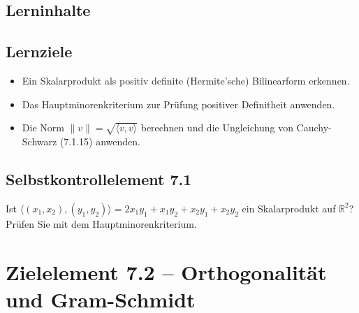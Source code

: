 \documentclass[a4paper,12pt]{article}
\begin{document}
\subsection*{Lerninhalte}
\begin{center}
\end{center}

\subsection*{Lernziele}
\begin{itemize}
  \item Ein Skalarprodukt als positiv definite (Hermite'sche) Bilinearform erkennen.
  \item Das Hauptminorenkriterium zur Prüfung positiver Definitheit anwenden.
  \item Die Norm $\|v\| = \sqrt{\langle v,v\rangle}$ berechnen und die Ungleichung von Cauchy-Schwarz (7.1.15) anwenden.
\end{itemize}

\subsection*{Selbstkontrollelement 7.1}
Ist $\langle (x_1,x_2),(y_1,y_2)\rangle = 2x_1y_1 + x_1y_2 + x_2y_1 + x_2y_2$ ein Skalarprodukt auf $\mathbb{R}^2$? Prüfen Sie mit dem Hauptminorenkriterium.

\newpage

\section*{Zielelement 7.2 -- Orthogonalität und Gram-Schmidt}
\end{document}
